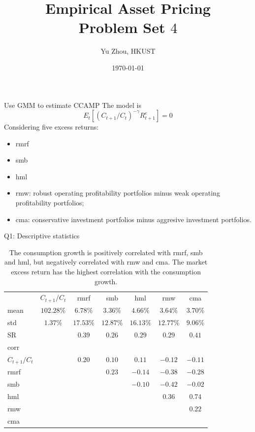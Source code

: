 \documentclass[10pt,t]{beamer}
\title{Empirical Asset Pricing \\ Problem Set $4$}
\author{Yu Zhou, HKUST}
\date{\today}
\begin{document}
\maketitle

\begin{frame}{Use GMM to estimate CCAMP}
The model is
$$
E_t[(C_{t+1} / C_t)^{-\gamma} R_{t+1}^e] = 0
$$
Considering five excess returns:
\begin{itemize}
	\item rmrf
	\item smb
	\item hml
	\item rmw: robust operating profitability portfolios minus weak operating profitability portfolios;
	\item cma: conservative investment portfolios minus aggresive investment portfolios.
\end{itemize}
\end{frame}


\begin{frame}{Q1: Descriptive statistics}
\begin{table}
\begin{tabular}{lcccccc}
\toprule
 & $C_{t+1} / C_{t}$ & rmrf & smb & hml & rmw & cma \\
\cmidrule{1-7}
mean & $102.28\%$ & $6.78\%$ & $3.36\%$ & $4.66\%$ & $3.64\%$ & $3.70\%$ \\
std & $1.37\%$ & $17.53\%$ & $12.87\%$ & $16.13\%$ & $12.77\%$ & $9.06\%$ \\
SR & & $0.39$ & $0.26$ & $0.29$ & $0.29$ & $0.41$ \\
\cmidrule{1-7}
corr &&&&&& \\
$C_{t+1} / C_{t}$ & & $0.20$ & $0.10$ & $0.11$ & $-0.12$ & $-0.11$ \\
rmrf & & & $0.23$ & $-0.14$ & $-0.38$ & $-0.28$ \\
smb &&&& $-0.10$ & $-0.42$ & $-0.02$ \\
hml &&&&& $0.36$ & $0.74$ \\
rmw &&&&&& $0.22$ \\
cma &&&&&& \\
\bottomrule
\end{tabular}
\caption{The consumption growth is positively correlated with rmrf, smb and hml, but negatively correlated with rmw and cma. The market excess return has the highest correlation with the consumption growth.}
\end{table}
\end{frame}
\end{document}
